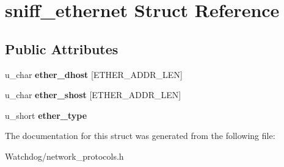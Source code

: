 \hypertarget{structsniff__ethernet}{\section{sniff\-\_\-ethernet Struct Reference}
\label{structsniff__ethernet}
}
\subsection*{Public Attributes}
\begin{DoxyCompactItemize}
\item 
\hypertarget{structsniff__ethernet_aefda8dbb54243c93c4d267ada25ba17f}{u\-\_\-char {\bfseries ether\-\_\-dhost} \mbox{[}E\-T\-H\-E\-R\-\_\-\-A\-D\-D\-R\-\_\-\-L\-E\-N\mbox{]}}\label{structsniff__ethernet_aefda8dbb54243c93c4d267ada25ba17f}

\item 
\hypertarget{structsniff__ethernet_afe9a93573af998a8652b2c8b1694dd51}{u\-\_\-char {\bfseries ether\-\_\-shost} \mbox{[}E\-T\-H\-E\-R\-\_\-\-A\-D\-D\-R\-\_\-\-L\-E\-N\mbox{]}}\label{structsniff__ethernet_afe9a93573af998a8652b2c8b1694dd51}

\item 
\hypertarget{structsniff__ethernet_ae66770fd4e71d27c6a6619670bac2efb}{u\-\_\-short {\bfseries ether\-\_\-type}}\label{structsniff__ethernet_ae66770fd4e71d27c6a6619670bac2efb}

\end{DoxyCompactItemize}


The documentation for this struct was generated from the following file\-:\begin{DoxyCompactItemize}
\item 
Watchdog/network\-\_\-protocols.\-h\end{DoxyCompactItemize}
